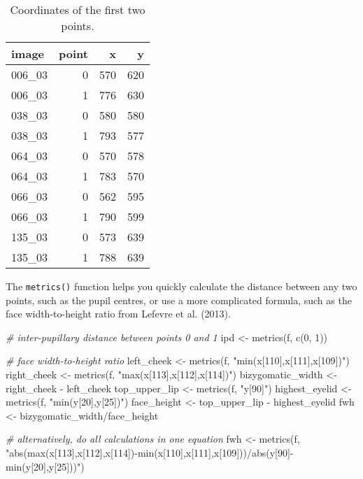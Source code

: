 \documentclass[
  doc,floatsintext]{apa6}
\newenvironment{Shaded}{\begin{snugshade}}{\end{snugshade}}
\newcommand{\CommentTok}[1]{\textcolor[rgb]{0.56,0.35,0.01}{\textit{#1}}}
\newcommand{\DecValTok}[1]{\textcolor[rgb]{0.00,0.00,0.81}{#1}}
\newcommand{\FunctionTok}[1]{\textcolor[rgb]{0.00,0.00,0.00}{#1}}
\newcommand{\NormalTok}[1]{#1}
\newcommand{\OtherTok}[1]{\textcolor[rgb]{0.56,0.35,0.01}{#1}}
\newcommand{\SpecialCharTok}[1]{\textcolor[rgb]{0.00,0.00,0.00}{#1}}
\newcommand{\StringTok}[1]{\textcolor[rgb]{0.31,0.60,0.02}{#1}}
\begin{document}
\begin{table}

\caption{\label{tab:unnamed-chunk-7}Coordinates of the first two points.}
\centering
\begin{tabular}[t]{l|r|r|r}
\hline
image & point & x & y\\
\hline
006\_03 & 0 & 570 & 620\\
\hline
006\_03 & 1 & 776 & 630\\
\hline
038\_03 & 0 & 580 & 580\\
\hline
038\_03 & 1 & 793 & 577\\
\hline
064\_03 & 0 & 570 & 578\\
\hline
064\_03 & 1 & 783 & 570\\
\hline
066\_03 & 0 & 562 & 595\\
\hline
066\_03 & 1 & 790 & 599\\
\hline
135\_03 & 0 & 573 & 639\\
\hline
135\_03 & 1 & 788 & 639\\
\hline
\end{tabular}
\end{table}

The \texttt{metrics()} function helps you quickly calculate the distance between any two points, such as the pupil centres, or use a more complicated formula, such as the face width-to-height ratio from Lefevre et al. (2013).

\begin{Shaded}
\begin{Highlighting}[]
\CommentTok{\# inter{-}pupillary distance between points 0 and 1}
\NormalTok{ipd }\OtherTok{\textless{}{-}} \FunctionTok{metrics}\NormalTok{(f, }\FunctionTok{c}\NormalTok{(}\DecValTok{0}\NormalTok{, }\DecValTok{1}\NormalTok{))}

\CommentTok{\# face width{-}to{-}height ratio}
\NormalTok{left\_cheek }\OtherTok{\textless{}{-}} \FunctionTok{metrics}\NormalTok{(f, }\StringTok{"min(x[110],x[111],x[109])"}\NormalTok{)}
\NormalTok{right\_cheek }\OtherTok{\textless{}{-}} \FunctionTok{metrics}\NormalTok{(f, }\StringTok{"max(x[113],x[112],x[114])"}\NormalTok{)}
\NormalTok{bizygomatic\_width }\OtherTok{\textless{}{-}}\NormalTok{ right\_cheek }\SpecialCharTok{{-}}\NormalTok{ left\_cheek}
\NormalTok{top\_upper\_lip }\OtherTok{\textless{}{-}} \FunctionTok{metrics}\NormalTok{(f, }\StringTok{"y[90]"}\NormalTok{)}
\NormalTok{highest\_eyelid }\OtherTok{\textless{}{-}} \FunctionTok{metrics}\NormalTok{(f, }\StringTok{"min(y[20],y[25])"}\NormalTok{)}
\NormalTok{face\_height }\OtherTok{\textless{}{-}}\NormalTok{ top\_upper\_lip }\SpecialCharTok{{-}}\NormalTok{ highest\_eyelid}
\NormalTok{fwh }\OtherTok{\textless{}{-}}\NormalTok{ bizygomatic\_width}\SpecialCharTok{/}\NormalTok{face\_height}

\CommentTok{\# alternatively, do all calculations in one equation}
\NormalTok{fwh }\OtherTok{\textless{}{-}} \FunctionTok{metrics}\NormalTok{(f, }\StringTok{"abs(max(x[113],x[112],x[114]){-}min(x[110],x[111],x[109]))/abs(y[90]{-}min(y[20],y[25]))"}\NormalTok{)}
\end{Highlighting}
\end{Shaded}
\end{document}
